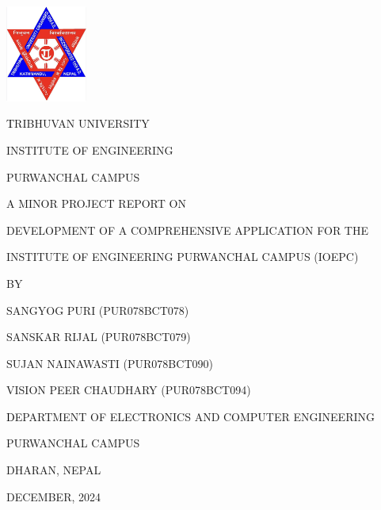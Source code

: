 \begin{titlepage}
    \centering
    
    \includegraphics[width=0.2\textwidth]{Graphics/TULogo.png}\par
    \vspace{1.2cm}
    {\fontsize{14pt}{12pt}\selectfont\textcolor{black}
    TRIBHUVAN UNIVERSITY \par INSTITUTE OF ENGINEERING \par PURWANCHAL CAMPUS \par
    \vspace{1.2cm}
    \begin{flushleft}
    
    \end{flushleft}

    \par A MINOR PROJECT REPORT ON\par DEVELOPMENT OF A COMPREHENSIVE APPLICATION FOR THE \par INSTITUTE OF ENGINEERING PURWANCHAL CAMPUS (IOEPC) \par

    \vspace{1.2cm}
    BY\par SANGYOG PURI (PUR078BCT078)
      \par SANSKAR RIJAL (PUR078BCT079)
      \par SUJAN NAINAWASTI (PUR078BCT090)
      \par VISION PEER CHAUDHARY (PUR078BCT094)
    \par
    \vspace{1.2cm}\par
    }
    {\fontsize{13pt}{12pt}\selectfont\textcolor{black}
    DEPARTMENT OF ELECTRONICS AND COMPUTER ENGINEERING\par PURWANCHAL CAMPUS\par DHARAN, NEPAL\par
    \vspace{1.2cm}
    \vspace{1.2cm}
    
    DECEMBER, 2024 
    }
\end{titlepage}

